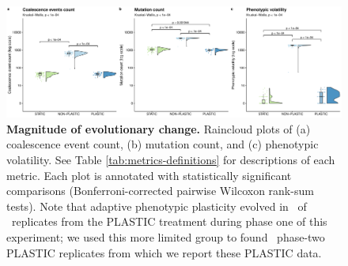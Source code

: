 
\begin{figure}[h!]
    \centering
    \includegraphics[width=1\textwidth]{media/evolutionary-change-magnitude-panel.pdf}
    \caption{\small
    \textbf{Magnitude of evolutionary change.}
    Raincloud plots \citep{allen_raincloud_2019} of 
    (a) coalescence event count, 
    (b) mutation count, 
    and (c) phenotypic volatility. 
    See Table \ref{tab:metrics-definitions} for descriptions of each metric.
    Each plot is annotated with statistically significant comparisons (Bonferroni-corrected pairwise Wilcoxon rank-sum tests).
    Note that adaptive phenotypic plasticity evolved in \evolutionaryChangeRatePlasticReps\ of \evolutionaryChangeRateReplicates\ replicates from the PLASTIC treatment during phase one of this experiment; we used this more limited group to found \evolutionaryChangeRatePlasticReps\ phase-two PLASTIC replicates from which we report these PLASTIC data.
    }
    \label{fig:evolutionary-dynamics-magnitude}
\end{figure}